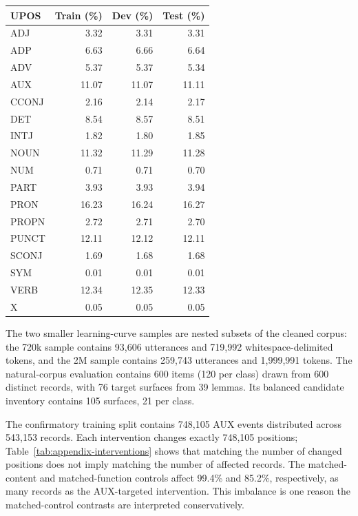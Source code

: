 \documentclass[11pt]{article}
\begin{document}
\begin{center}
  \small
  \setlength{\tabcolsep}{4pt}
  \renewcommand{\arraystretch}{0.94}
  \begin{tabular}{@{}lrrr@{}}
    \toprule
    UPOS & Train (\%) & Dev (\%) & Test (\%) \\
    \midrule
    ADJ   & 3.32  & 3.31  & 3.31 \\
    ADP   & 6.63  & 6.66  & 6.64 \\
    ADV   & 5.37  & 5.37  & 5.34 \\
    AUX   & 11.07 & 11.07 & 11.11 \\
    CCONJ & 2.16  & 2.14  & 2.17 \\
    DET   & 8.54  & 8.57  & 8.51 \\
    INTJ  & 1.82  & 1.80  & 1.85 \\
    NOUN  & 11.32 & 11.29 & 11.28 \\
    NUM   & 0.71  & 0.71  & 0.70 \\
    PART  & 3.93  & 3.93  & 3.94 \\
    PRON  & 16.23 & 16.24 & 16.27 \\
    PROPN & 2.72  & 2.71  & 2.70 \\
    PUNCT & 12.11 & 12.12 & 12.11 \\
    SCONJ & 1.69  & 1.68  & 1.68 \\
    SYM   & 0.01  & 0.01  & 0.01 \\
    VERB  & 12.34 & 12.35 & 12.33 \\
    X     & 0.05  & 0.05  & 0.05 \\
    \bottomrule
  \end{tabular}
  \label{tab:appendix-pos}
\end{center}

The two smaller learning-curve samples are nested subsets of the cleaned corpus: the 720k sample contains 93,606 utterances and 719,992 whitespace-delimited tokens, and the 2M sample contains 259,743 utterances and 1,999,991 tokens. The natural-corpus evaluation contains 600 items (120 per class) drawn from 600 distinct records, with 76 target surfaces from 39 lemmas. Its balanced candidate inventory contains 105 surfaces, 21 per class.

The confirmatory training split contains 748,105 AUX events distributed across 543,153 records. Each intervention changes exactly 748,105 positions; Table~\ref{tab:appendix-interventions} shows that matching the number of changed positions does not imply matching the number of affected records. The matched-content and matched-function controls affect 99.4\% and 85.2\%, respectively, as many records as the AUX-targeted intervention. This imbalance is one reason the matched-control contrasts are interpreted conservatively.
\end{document}
